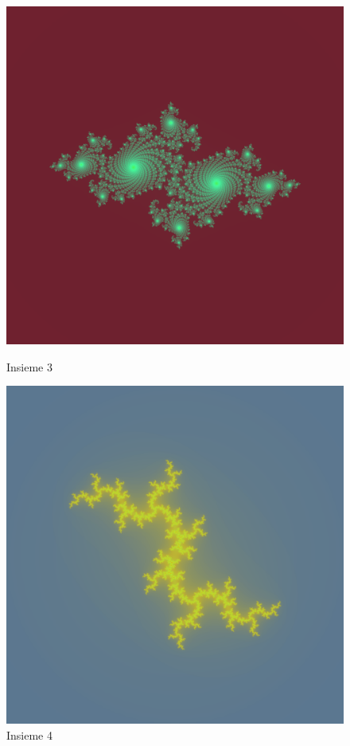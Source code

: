 \documentclass[10pt]{report}
\begin{document}
				\begin{figure}[H]
					\centering
					\includegraphics[width=0.5\linewidth]{"Insieme di Julia/julia4"}
					\caption*{ \footnotesize{Insieme 3} }
					\label{fig:julia3}
					\endminipage \hfill
					\centering
					\includegraphics[width=0.5\linewidth]{"Insieme di Julia/julia6"}
					\caption*{ \footnotesize{Insieme 4} }
					\label{fig:julia4}
					\endminipage \hfill
				\end{figure}
\end{document}
